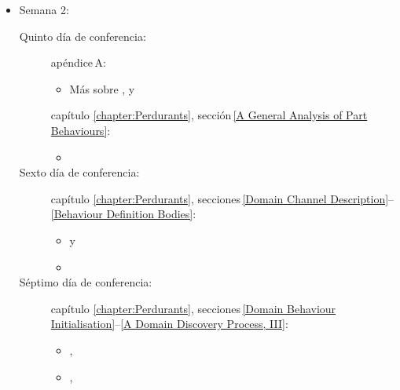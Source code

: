 {\begin{itemize}
\begin{description}
\item[Cuarto día de conferencia:] secciones\,\,\ref{chap4.Attributes}--\ref{A
    Domain Discovery Process, II}:
\begin{itemize}
\item {},
\item {},
\item {}
\end{itemize}
\end{description}
\item Semana 2:
\begin{description}
\item[Quinto día de conferencia:]  apéndice\,A: 
\begin{itemize}
\item {}  Más sobre , y
\end{itemize}
 capítulo\,\,\ref{chapter:Perdurants}, sección\,\ref{A General Analysis of Part  Behaviours}:
\begin{itemize}
\item {}
\end{itemize}
\item[Sexto día de conferencia:] capítulo\,\,\ref{chapter:Perdurants},
  secciones\,\ref{Domain Channel Description}--\ref{Behaviour Definition Bodies}: 
\begin{itemize}
\item {} y
\item {}
\end{itemize}
\item[Séptimo día de conferencia:] capítulo\,\,\ref{chapter:Perdurants},
  secciones\,\ref{Domain Behaviour Initialisation}--\ref{A Domain Discovery Process, III}:
\begin{itemize}
\item {}, 
\item {}, %
\end{itemize}
\end{description}
\end{itemize}
\afslut
}%

